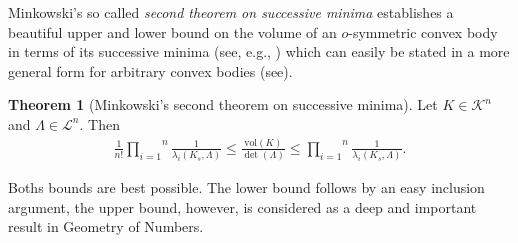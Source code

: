 \documentclass{amsart}
\theoremstyle{definition}
\newtheorem{theoman}{Theorem}[section]
\theoremstyle{remark}
\numberwithin{equation}{section}
\begin{document}
Minkowski's so called {\it second theorem on successive minima} establishes a beautiful 
upper and lower bound on the volume of an $o$-symmetric convex body in terms of its successive minima (see, e.g., \cite{minkowski1896}) which can easily be stated in a more general form for arbitrary convex bodies (see).  


\begin{theoman}[Minkowski's second theorem on successive minima]
    Let $K\in\mathcal{K}^n$ and $\Lambda\in\mathcal{L}^n$. Then
    \begin{align*}
     \frac{1}{n!}\overset{n}{\underset{i=1}{\prod}}\frac{1}{\lambda_i(K_s,\Lambda)}\le\frac{\mathrm{vol}(K)}{\det(\Lambda)}\le\overset{n}{\underset{i=1}{\prod}}\frac{1}{\lambda_i(K_s,\Lambda)}.  
    \end{align*}
\label{thm:minkowski}    
\end{theoman}
Boths bounds are best possible. The lower bound follows by an easy inclusion argument, the upper bound, however, is considered as a deep and important result in Geometry of Numbers. 
\end{document}
